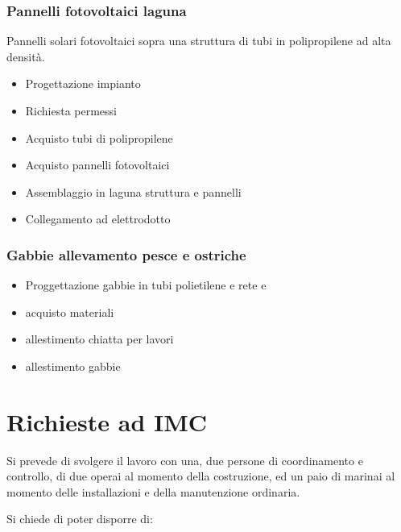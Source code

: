 \documentclass[
  onecolumn]{report}
\begin{document}
\hypertarget{pannelli-fotovoltaici-laguna}{%
\subsubsection{Pannelli fotovoltaici
laguna}\label{pannelli-fotovoltaici-laguna}}

Pannelli solari fotovoltaici sopra una struttura di tubi in
polipropilene ad alta densità.

\begin{itemize}
\item
  Progettazione impianto
\item
  Richiesta permessi
\item
  Acquisto tubi di polipropilene
\item
  Acquisto pannelli fotovoltaici
\item
  Assemblaggio in laguna struttura e pannelli
\item
  Collegamento ad elettrodotto
\end{itemize}

\hypertarget{gabbie-allevamento-pesce-e-ostriche}{%
\subsubsection{Gabbie allevamento pesce e
ostriche}\label{gabbie-allevamento-pesce-e-ostriche}}

\begin{itemize}
\item
  Proggettazione gabbie in tubi polietilene e rete e
\item
  acquisto materiali
\item
  allestimento chiatta per lavori
\item
  allestimento gabbie
\end{itemize}

\hypertarget{richieste-ad-imc}{%
\section{Richieste ad IMC}\label{richieste-ad-imc}}

Si prevede di svolgere il lavoro con una, due persone di coordinamento e
controllo, di due operai al momento della costruzione, ed un paio di
marinai al momento delle installazioni e della manutenzione ordinaria.

Si chiede di poter disporre di:
\end{document}
